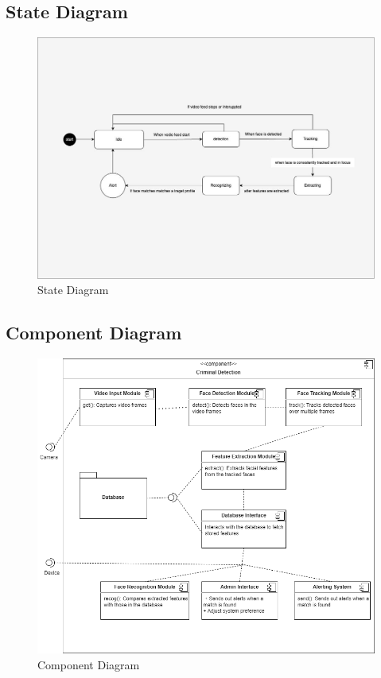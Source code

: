 	\pagebreak

	\subsection{State Diagram}
		\begin{figure}[h!]
			\includegraphics[width=\textwidth]{components/images/state.jpeg}
			\caption{State Diagram}
			\label{fig:state}
		\end{figure}

	\pagebreak

	\subsection{Component Diagram}
		\begin{figure}[h!]
			\includegraphics[width=\textwidth]{components/images/component.png}
			\caption{Component Diagram}
			\label{fig:component}
		\end{figure}
		\pagebreak

